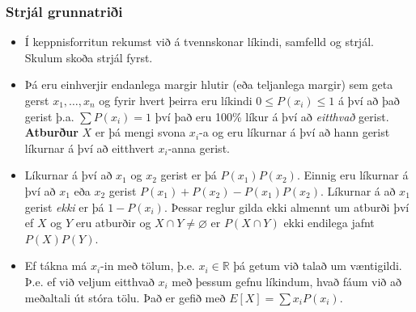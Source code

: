 \documentclass{beamer}
\begin{document}
\begin{frame}
\frametitle{Strjál grunnatriði}

\begin{itemize}

\item<1-> Í keppnisforritun rekumst við á tvennskonar líkindi, samfelld og strjál. Skulum skoða strjál fyrst.

\item<2-> Þá eru einhverjir endanlega margir hlutir (eða teljanlega margir) sem geta gerst $x_1,\dots,x_n$ og fyrir hvert þeirra eru líkindi $0 \leq P(x_i) \leq 1$ á því að það gerist þ.a. $\sum P(x_i) = 1$ því það eru 100\% líkur á því að \textit{eitthvað} gerist. \textbf{Atburður} $X$ er þá mengi svona $x_i$-a og eru líkurnar á því að hann gerist líkurnar á því að eitthvert $x_i$-anna gerist.

\item<3-> Líkurnar á því að $x_1$ og $x_2$ gerist er þá $P(x_1)P(x_2)$. Einnig eru líkurnar á því að $x_1$ eða $x_2$ gerist $P(x_1) + P(x_2) - P(x_1)P(x_2)$. Líkurnar á að $x_1$ gerist \textit{ekki} er þá $1 - P(x_i)$. Þessar reglur gilda ekki almennt um atburði því ef $X$ og $Y$ eru atburðir og $X \cap Y \neq \varnothing$ er $P(X \cap Y)$ ekki endilega jafnt $P(X)P(Y)$.

\item<4-> Ef tákna má $x_i$-in með tölum, þ.e. $x_i \in \mathbb{R}$ þá getum við talað um væntigildi. Þ.e. ef við veljum eitthvað $x_i$ með þessum gefnu líkindum, hvað fáum við að meðaltali út stóra tölu. Það er gefið með $E[X] = \sum x_i P(x_i)$.

\end{itemize}

\end{frame}
\end{document}
